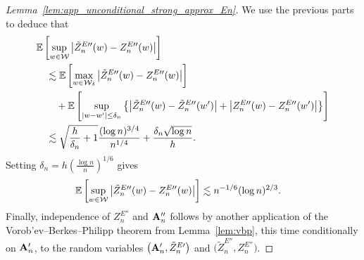 \begin{proof}[Lemma~\ref{lem:app_unconditional_strong_approx_En}]
  We use the previous parts
  to deduce that
  \begin{align*}
    &\mathbb{E}\left[
      \sup_{w \in \mathcal{W}}
      \big|\tilde Z_n^{E\prime\prime}(w) - Z_n^{E\prime\prime}(w)\big|
    \right] \\
    &\quad\lesssim
    \mathbb{E}\left[
      \max_{w \in \mathcal{W}_\delta}
      \big|\tilde Z_n^{E\prime\prime}(w) - Z_n^{E\prime\prime}(w)\big|
    \right] \\
    &\qquad+
    \mathbb{E}\left[
      \sup_{|w-w'| \leq \delta_n}
      \left\{
        \big|\tilde Z_n^{E\prime\prime}(w) - \tilde Z_n^{E\prime\prime}(w')\big|
        + \big|Z_n^{E\prime\prime}(w) - Z_n^{E\prime\prime}(w')\big|
      \right\}
    \right] \\
    &\quad\lesssim
    \sqrt{\frac{h}{\delta_n} + 1}
    \frac{(\log n)^{3/4}}{n^{1/4}}
    + \frac{\delta_n \sqrt{\log n}}{h}.
  \end{align*}
  Setting
  $\delta_n = h \left( \frac{\log n}{n} \right)^{1/6}$
  gives
  \begin{align*}
    \mathbb{E}\left[
      \sup_{w \in \mathcal{W}}
      \big|\tilde Z_n^{E\prime\prime}(w) - Z_n^{E\prime\prime}(w)\big|
    \right]
    &\lesssim
    n^{-1/6} (\log n)^{2/3}.
  \end{align*}
  Finally, independence of $Z_n^{E\dprime}$ and $\mathbf{A}_n''$
  follows by another application of
  the Vorob'ev--Berkes--Philipp theorem
  from Lemma~\ref{lem:vbp},
  this time conditionally on $\mathbf{A}_n'$,
  to the random variables
  $\big(\mathbf{A}_n', \tilde Z_n^{E\prime}\big)$
  and
  $\big(\tilde Z_n^{E\dprime}, Z_n^{E\dprime}\big)$.
\end{proof}

